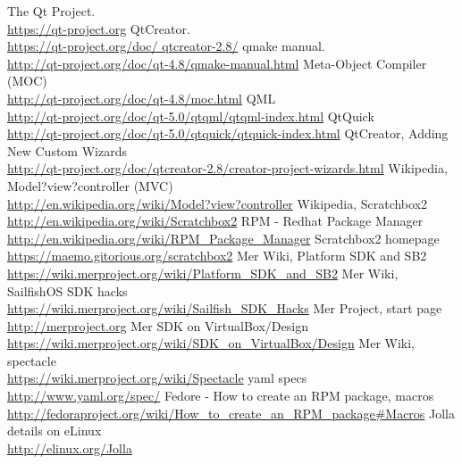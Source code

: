 \begin{thebibliography}{xxxxxxxxxxxx}
%
%
 The Qt Project. \\\url{https://qt-project.org}
 QtCreator. \\\url{https://qt-project.org/doc/
qtcreator-2.8/}
 qmake manual. \\\url{http://qt-project.org/doc/qt-4.8/qmake-manual.html}
 Meta-Object Compiler (MOC) \\\url{http://qt-project.org/doc/qt-4.8/moc.html}
 QML \\\url{http://qt-project.org/doc/qt-5.0/qtqml/qtqml-index.html}
 QtQuick \\\url{http://qt-project.org/doc/qt-5.0/qtquick/qtquick-index.html}
 QtCreator, Adding New Custom Wizards\\\url{http://qt-project.org/doc/qtcreator-2.8/creator-project-wizards.html}
%
%
 Wikipedia, Model?view?controller (MVC) \\\url{http://en.wikipedia.org/wiki/Model?view?controller}
 Wikipedia, Scratchbox2 \\\url{http://en.wikipedia.org/wiki/Scratchbox2}
 RPM - Redhat Package Manager \\\url{http://en.wikipedia.org/wiki/RPM_Package_Manager}
%
%
 Scratchbox2 homepage \\\url{https://maemo.gitorious.org/scratchbox2}
%
%
 Mer Wiki, Platform SDK and SB2 \\\url{https://wiki.merproject.org/wiki/Platform_SDK_and_SB2}
 Mer Wiki, SailfishOS SDK hacks \\\url{https://wiki.merproject.org/wiki/Sailfish_SDK_Hacks}
 Mer Project, start page \\\url{http://merproject.org}
 Mer SDK on VirtualBox/Design \url{https://wiki.merproject.org/wiki/SDK_on_VirtualBox/Design}
 Mer Wiki, spectacle \\\url{https://wiki.merproject.org/wiki/Spectacle}
%
%
 yaml specs \\\url{http://www.yaml.org/spec/}
 Fedore - How to create an RPM package, macros \\\url{http://fedoraproject.org/wiki/How_to_create_an_RPM_package#Macros}
%
%
 Jolla details on eLinux \\\url{http://elinux.org/Jolla}

\end{thebibliography}
